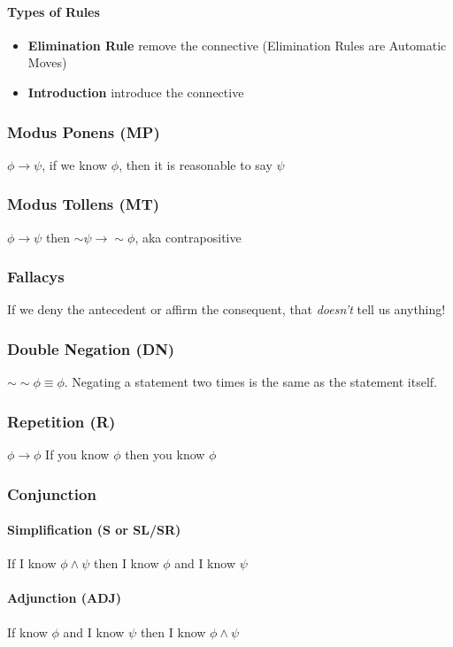 \documentclass[10pt]{article}
\begin{document}
\paragraph{Types of Rules}
\begin{itemize}
    \item \textbf{Elimination Rule} remove the connective (Elimination
     Rules are Automatic Moves)
    \item \textbf{Introduction} introduce the connective
\end{itemize}

\subsubsection{Modus Ponens (MP)} $\phi \rightarrow \psi$, if we know $\phi$, then it is reasonable to say $\psi$
\subsubsection{Modus Tollens (MT)} $\phi \rightarrow \psi$ then $\sim\psi \rightarrow \sim\phi$, aka contrapositive
\subsubsection*{Fallacys} If we deny the antecedent or affirm the consequent, that \textit{doesn't} tell us anything!
\subsubsection{Double Negation (DN)} $\sim\sim\phi \equiv \phi$. Negating a statement two times is the same as the statement itself.
\subsubsection{Repetition (R)} $\phi \rightarrow \phi$ If you know $\phi$ then you know $\phi$

\subsubsection{Conjunction}
\paragraph{Simplification (S or SL/SR)} If I know $\phi\land \psi$ then
 I know $\phi$ and I know $\psi$
\paragraph{Adjunction (ADJ)} If know $\phi$ and I know $\psi$ then I
 know $\phi\land\psi$
\end{document}
